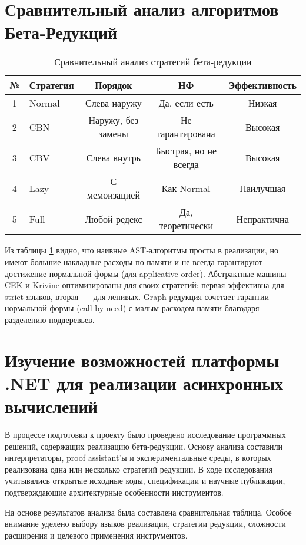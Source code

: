 \section{Сравнительный анализ алгоритмов Бета‑Редукций}
\label{sec:comparison-beta}


\begin{table}[h]
\caption{Сравнительный анализ стратегий бета‑редукции}
\label{tbl:cmp-strategies}
\centering
\footnotesize
\begin{tabular}{|c|l|c|c|c|}
\hline
№ & Стратегия & Порядок & НФ & Эффективность \\
\hline
1 & Normal & Слева наружу & Да, если есть & Низкая \\
2 & CBN & Наружу, без замены & Не гарантирована & Высокая \\
3 & CBV & Слева внутрь & Быстрая, но не всегда & Высокая \\
4 & Lazy & С мемоизацией & Как Normal & Наилучшая \\
5 & Full & Любой редекс & Да, теоретически & Непрактична \\
\hline
\end{tabular}
\end{table}

\medskip

\noindent
Из таблицы \ref{tbl:cmp-strategies} видно, что наивные AST‑алгоритмы просты в реализации, но имеют большие накладные расходы по памяти и не всегда гарантируют достижение нормальной формы (для applicative order). Абстрактные машины CEK и Krivine оптимизированы для своих стратегий: первая эффективна для strict‑языков, вторая — для ленивых. Graph‑редукция сочетает гарантии нормальной формы (call‑by‑need) с малым расходом памяти благодаря разделению поддеревьев.


\section{Изучение возможностей платформы .NET для реализации асинхронных вычислений}
\label{sec:dotnet-async}

В процессе подготовки к проекту было проведено исследование программных решений, содержащих реализацию бета‑редукции. Основу анализа составили интерпретаторы, proof assistant’ы и экспериментальные среды, в которых реализована одна или несколько стратегий редукции. В ходе исследования учитывались открытые исходные коды, спецификации и научные публикации, подтверждающие архитектурные особенности инструментов.  

На основе результатов анализа была составлена сравнительная таблица. Особое внимание уделено выбору языков реализации, стратегии редукции, сложности расширения и целевого применения инструментов.


